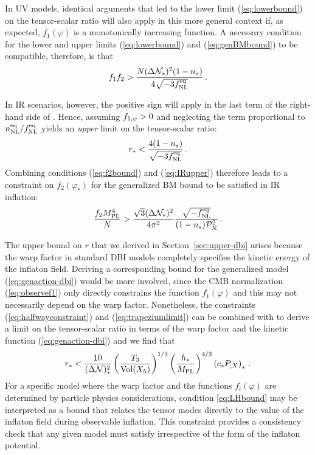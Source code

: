 In UV models, identical arguments that led to 
the lower limit (\ref{eq:lowerbound}) on the tensor-scalar ratio
will also apply in this more general context if, as expected, $f_1 (\varphi) $ 
is a monotonically increasing function. A necessary condition for
the lower and upper limits
(\ref{eq:lowerbound}) and (\ref{eq:genBMbound}) to be compatible, therefore, is  
that  
% 
\begin{equation}
\label{eq:evade}
f_1f_2 > \frac{N (\Delta \mathcal{N}_*)^2 (1-n_s)}{4\sqrt{-3f_{\mathrm{NL}}^{\mathrm{eq}}}} \,.
\end{equation}
% 


In IR scenarios, however, the positive sign will apply in the 
last term of the right-hand side of .
Hence, assuming $f_{1,\varphi} >0$ and neglecting the term proportional to 
$n_{\mathrm{NL}}^{\mathrm{eq}}/f_{\mathrm{NL}}^{\mathrm{eq}}$ yields an {\em upper} limit on the tensor-scalar ratio:
% 
\begin{equation}
\label{eq:IRupper}
r_* < \frac{4(1-n_s)}{\sqrt{-3f_{\mathrm{NL}}^{\mathrm{eq}}}}  \,.
\end{equation}
% 
Combining conditions (\ref{eq:f2bound}) and (\ref{eq:IRupper}) 
therefore leads to a constraint on $f_2 (\varphi_*) $
for the generalized BM bound to be satisfied in IR inflation: 
% 
\begin{equation}
\label{eq:f2IRlower}
\frac{f_2M_{\mathrm{PL}}^4}{N} > \frac{\sqrt{3} (\Delta \mathcal{N}_*)^2}{4\pi^2}
\frac{\sqrt{-f_{\mathrm{NL}}^{\mathrm{eq}}}}{(1-n_s)\mathcal{P}_{\mathcal{R}}^2 }  \,.
\end{equation}
% 

The upper bound on $r$ that we derived in Section~\ref{sec:upper-dbi} arises 
because the warp factor in standard DBI models 
completely specifies the kinetic 
energy of the inflaton field. Deriving a corresponding bound for 
the generalized model (\ref{eq:genaction-dbi}) would be more involved, 
since the CMB normalization (\ref{eq:observef1}) only 
directly constrains the function 
$f_1 (\varphi )$ and this may not necessarily depend on the warp factor. 
Nonetheless, the constraints (\ref{eq:halfwayconstraint}) and
(\ref{eq:trapeziumlimit}) can be 
combined with  to derive a limit 
on the tensor-scalar ratio in terms of the warp factor and the 
kinetic function (\ref{eq:genaction-dbi}) and we find that  
% 
\begin{equation}
\label{eq:LHbound}
r_* < \frac{10}{(\Delta \mathcal{N})_*^2} \left( \frac{T_3}{\mathrm{Vol} (X_5)} \right)^{1/3} 
\left( \frac{h_*}{M_{\mathrm{PL}}} \right)^{4/3} \left( c_s P_{,X} \right)_* \,.
\end{equation}
% 
For a specific model where the warp factor and 
the functions $f_i (\varphi )$ are determined by particle 
physics considerations,   
condition \eqref{eq:LHbound} 
may be interpreted as a bound that relates 
the tensor modes directly to the value of the inflaton field during observable 
inflation. This constraint provides a consistency 
check that any given model must satisfy 
irrespective of the form of the inflaton potential. 
% 


